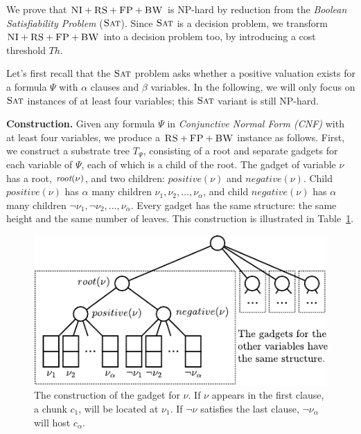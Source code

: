 \documentclass[9pt]{sigcomm-alternate}
\newcommand{\variab}{\nu}
\newcommand{\aroot}{\emph{root}}
\newcommand{\clauses}{\alpha}
\newcommand{\variables}{\beta}
\newcommand{\achunk}{\ensuremath{c}}
\newcommand{\CC}{\textsc{NI}}
\newcommand{\FP}{\textsc{FP}}
\newcommand{\RS}{\textsc{RS}}
\newcommand{\BW}{\textsc{BW}}
\newcommand{\Tree}{\ensuremath{T}}
\newcommand{\SAT}{\textsc{Sat}}
\newcommand{\Formula}{\ensuremath{\Psi}}
\newcommand{\Thr}{\ensuremath{Th}}
\newcommand{\positive}{\ensuremath{positive}}
\newcommand{\negative}{\ensuremath{negative}}
\begin{document}
\begin{appendix}
We prove that $\CC+\RS+\FP+\BW$ is NP-hard by reduction from the \emph{Boolean Satisfiability Problem} ($\SAT$).
Since $\SAT$ is a decision
problem, we transform $\CC+\RS+\FP+\BW$ into a decision problem too, by
introducing a cost threshold $\Thr$.

Let's first recall that the $\SAT$ problem asks whether a positive valuation exists
for a formula $\Formula$ with $\clauses$ clauses and $\variables$ variables.
In the following, we will only focus on $\SAT$ instances of at least four variables;
this $\SAT$ variant is still NP-hard.

\textbf{Construction.}
Given any formula $\Formula$ in \emph{Conjunctive Normal Form (CNF)} with at least four variables, we produce
a $\RS+\FP+\BW$ instance as follows. First, we construct a substrate tree $\Tree_{\Formula}$, consisting of
a root and separate gadgets for each variable of $\Formula$, each of which
is a child of the root.
The gadget of variable $\variab$ has a root, $\aroot(\variab)$, and two children:
$\positive(\variab)$ and $\negative(\variab)$. Child $\positive(\variab)$ has $\clauses$
many children $\nu_1, \nu_2, \ldots, \nu_{\clauses}$, and child
$\negative(\variab)$ has
$\clauses$ many children $\neg \nu_1, \neg \nu_2, \dots, \nu_{\clauses}$. Every
gadget has the same structure: the same height and the same number of
leaves. This construction is illustrated in
Table~\ref{fig:construction_3sat}.


\begin{figure}
\includegraphics[width=\columnwidth]{figs/construction_3sat}
\caption{The construction of the gadget for $\nu$. If $\nu$ appears in the
first clause, a chunk $\achunk_1$, will be located at $\nu_1$. If $\neg \nu$
satisfies the last clause, $\neg
\nu_\alpha$ will host $\achunk_\alpha$.}
\label{fig:construction_3sat}
\end{figure}



\end{appendix}
\end{document}
